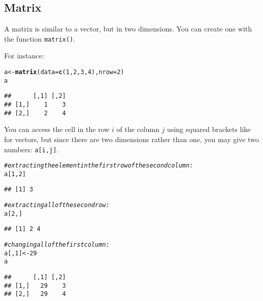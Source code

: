 \documentclass[12pt,a4paper]{scrartcl}\usepackage[]{graphicx}\usepackage[]{color}
\makeatletter
\newcommand{\hlnum}[1]{\textcolor[rgb]{0.686,0.059,0.569}{#1}}%
\newcommand{\hlcom}[1]{\textcolor[rgb]{0.678,0.584,0.686}{\textit{#1}}}%
\newcommand{\hlstd}[1]{\textcolor[rgb]{0.345,0.345,0.345}{#1}}%
\newcommand{\hlkwb}[1]{\textcolor[rgb]{0.69,0.353,0.396}{#1}}%
\newcommand{\hlkwc}[1]{\textcolor[rgb]{0.333,0.667,0.333}{#1}}%
\newcommand{\hlkwd}[1]{\textcolor[rgb]{0.737,0.353,0.396}{\textbf{#1}}}%
\newenvironment{kframe}{%
 \def\at@end@of@kframe{}%
 \ifinner\ifhmode%
  \def\at@end@of@kframe{\end{minipage}}%
  \begin{minipage}{\columnwidth}%
 \fi\fi%
 \def\FrameCommand##1{\hskip\@totalleftmargin \hskip-\fboxsep
 \colorbox{shadecolor}{##1}\hskip-\fboxsep
     \hskip-\linewidth \hskip-\@totalleftmargin \hskip\columnwidth}%
 \MakeFramed {\advance\hsize-\width
   \@totalleftmargin\z@ \linewidth\hsize
   \@setminipage}}%
 {\par\unskip\endMakeFramed%
 \at@end@of@kframe}
\newenvironment{knitrout}{}{} %
\makeatother
\begin{document}
\subsection{Matrix}
A matrix is similar to a vector, but in two dimensions.
You can create one with the function \texttt{matrix()}.

For instance:
\begin{knitrout}
\color{fgcolor}\begin{kframe}
\begin{alltt}
\hlstd{a} \hlkwb{<-} \hlkwd{matrix}\hlstd{(}\hlkwc{data} \hlstd{=} \hlkwd{c}\hlstd{(}\hlnum{1}\hlstd{,}\hlnum{2}\hlstd{,}\hlnum{3}\hlstd{,}\hlnum{4}\hlstd{),} \hlkwc{nrow} \hlstd{=} \hlnum{2}\hlstd{)}
\hlstd{a}
\end{alltt}
\begin{verbatim}
##      [,1] [,2]
## [1,]    1    3
## [2,]    2    4
\end{verbatim}
\end{kframe}
\end{knitrout}

You can access the cell in the row $i$ of the column $j$ using squared brackets like for vectors, but since there are two dimensions rather than one, you may give two numbers: \texttt{a[i,j]}.

\begin{knitrout}
\color{fgcolor}\begin{kframe}
\begin{alltt}
\hlcom{#extracting the element in the first row of the second column:}
\hlstd{a[}\hlnum{1}\hlstd{,}\hlnum{2}\hlstd{]}
\end{alltt}
\begin{verbatim}
## [1] 3
\end{verbatim}
\begin{alltt}
\hlcom{# extracting all of the second row:}
\hlstd{a[}\hlnum{2}\hlstd{,]}
\end{alltt}
\begin{verbatim}
## [1] 2 4
\end{verbatim}
\begin{alltt}
\hlcom{# changing all of the first column:}
\hlstd{a[,}\hlnum{1}\hlstd{]} \hlkwb{<-} \hlnum{29}
\hlstd{a}
\end{alltt}
\begin{verbatim}
##      [,1] [,2]
## [1,]   29    3
## [2,]   29    4
\end{verbatim}
\end{kframe}
\end{knitrout}
\end{document}
